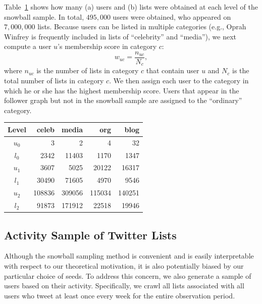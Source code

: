 \documentclass[phd,tocprelim]{cornell}
\renewcommand{\caption}[1]{\singlespacing\hangcaption{#1}\normalspacing}
\begin{document}
Table~\ref{tab:snowball_sample} shows how many (a) users and (b) lists were
obtained at each level of the snowball sample.  In total, $495,000$ users
were obtained, who appeared on $7,000,000$ lists.  Because users can be
listed in multiple categories (e.g., Oprah Winfrey is frequently included
in lists of ``celebrity'' and ``media''), we next compute a user $u$'s
membership score in category $c$:
\begin{equation}
w_{uc}=\frac{n_{uc}}{N_c},
\end{equation}
where $n_{uc}$ is the number of lists in category $c$ that contain user $u$
and $N_c$ is the total number of lists in category $c$. We then assign each
user to the category in which he or she has the highest membership
score. Users that appear in the follower graph but not in the snowball
sample are assigned to the ``ordinary'' category.


\begin{table}
\centering
\caption{Snowball Sample}
\label{tab:snowball_sample}
\begin{tabular}{|c|r|r|r|r|}
\hline
Level 		& celeb	& media & org 	& blog \\ \hline
$u_0$		& 3 	& 2 	& 4		& 32 \\ \hline
$l_0$		& 2342 	& 11403	& 1170 	& 1347 \\ \hline \hline
$u_1$		& 3607 	& 5025 	& 20122	& 16317 \\ \hline
$l_1$		& 30490 & 71605	& 4970 	& 9546 \\ \hline \hline
$u_2$		& 108836 & 309056 & 115034 & 140251 \\ \hline
$l_2$		& 91873 & 171912 & 22518 & 19946 \\ \hline
\end{tabular}
\end{table}


\subsection{Activity Sample of Twitter Lists}
Although the snowball sampling method is convenient and is easily
interpretable with respect to our theoretical motivation, it is also
potentially biased by our particular choice of seeds. To address this
concern, we also generate a sample of users based on their
activity. Specifically, we crawl all lists associated with all users who
tweet at least once every week for the entire observation period.
\end{document}
